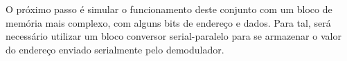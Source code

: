 O próximo passo é simular o funcionamento deste conjunto com um bloco de memória mais complexo, com alguns bits de endereço e dados. Para tal, será necessário utilizar um bloco conversor serial-paralelo para se armazenar o valor do endereço enviado serialmente pelo demodulador.


